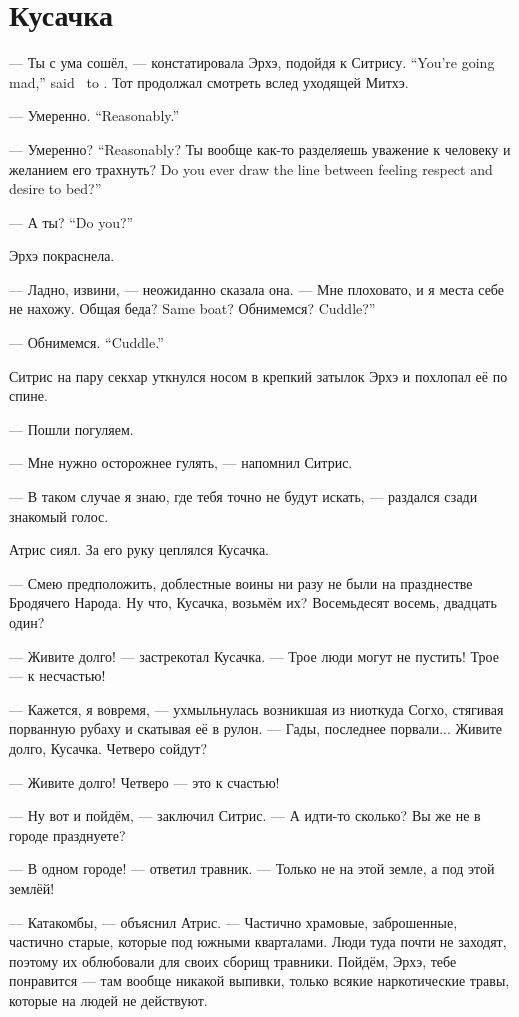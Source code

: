 \section{Кусачка}

{--- Ты с ума сошёл, --- констатировала Эрхэ, подойдя к Ситрису.}
{``You're going mad,'' said \Oerchoe\ to \Sitris.}
Тот продолжал смотреть вслед уходящей Митхэ.

{--- Умеренно.}
{``Reasonably.''}

{--- Умеренно?}
{``Reasonably?}
{Ты вообще как-то разделяешь уважение к человеку и желанием его трахнуть?}
{Do you ever draw the line between feeling respect and desire to bed?''}

{--- А ты?}
{``Do you?''}

Эрхэ покраснела.

--- Ладно, извини, --- неожиданно сказала она.
--- Мне плоховато, и я места себе не нахожу.
{Общая беда?}
{Same boat?}
{Обнимемся?}
{Cuddle?''}

{--- Обнимемся.}
{``Cuddle.''}

Ситрис на пару секхар уткнулся носом в крепкий затылок Эрхэ и похлопал её по спине.

--- Пошли погуляем.

--- Мне нужно осторожнее гулять, --- напомнил Ситрис.

--- В таком случае я знаю, где тебя точно не будут искать, --- раздался сзади знакомый голос.

Атрис сиял.
За его руку цеплялся Кусачка.

--- Смею предположить, доблестные воины ни разу не были на празднестве Бродячего Народа.
Ну что, Кусачка, возьмём их?
Восемьдесят восемь, двадцать один?

--- Живите долго! --- застрекотал Кусачка.
--- Трое люди могут не пустить!
Трое --- к несчастью!

--- Кажется, я вовремя, --- ухмыльнулась возникшая из ниоткуда Согхо, стягивая порванную рубаху и скатывая её в рулон.
--- Гады, последнее порвали...
Живите долго, Кусачка.
Четверо сойдут?

--- Живите долго!
Четверо --- это к счастью!

--- Ну вот и пойдём, --- заключил Ситрис.
--- А идти-то сколько?
Вы же не в городе празднуете?

--- В одном городе! --- ответил травник.
--- Только не на этой земле, а под этой землёй!

--- Катакомбы, --- объяснил Атрис.
--- Частично храмовые, заброшенные, частично старые, которые под южными кварталами.
Люди туда почти не заходят, поэтому их облюбовали для своих сборищ травники.
Пойдём, Эрхэ, тебе понравится --- там вообще никакой выпивки, только всякие наркотические травы, которые на людей не действуют.

